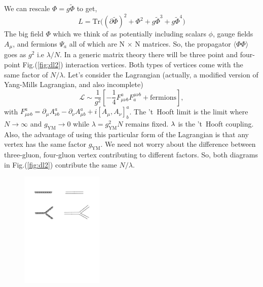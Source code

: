 We can rescale $ \Phi = g \tilde{\Phi}$  to get, 
\begin{equation}
L = \mathrm{Tr} \Bigg( (\partial \tilde{\Phi})^2 + \Phi^2 + g \tilde{\Phi}^3 + g \tilde{\Phi}^4  \Bigg)
\end{equation} 
The big field $\Phi$ which we think of as potentially including scalars $\phi$, gauge fields $A_{\mu}$, and fermions $\Psi_{a}$  all of which are N $\times$ N matrices.
So, the propagator $\langle \Phi \Phi \rangle$ goes as $g^2$ i.e $\lambda/N$. In a generic matrix theory there will be three point and four-point Fig.(\ref{fig:dl2}) interaction
vertices. Both types of vertices come with the same factor of $N/\lambda$. Let's consider the 
Lagrangian (actually, a modified version of Yang-Mills Lagrangian, and also incomplete)
\begin{equation}
\label{eq:action1}
\mathscr{L} \sim  \frac{1}{g^2} \left [ -\frac{1}{4} F_{\mu\nu b}^{a}F^{\mu\nu b}_{a} + \text{fermions} \right]  ,
\end{equation}
with $F_{\mu\nu b}^{a} = \partial_{\mu} A^{a}_{\nu b} - \partial_{\nu} A^{a}_{\mu b} + i [A_{\mu}, A_{\nu}]^{a}_{b}$. 
The 't~Hooft limit is the limit where $N \to \infty$ and $g_{\text{YM}} \to 0$ while $\lambda = g_{\text{YM}}^{2} N $ remains fixed. $\lambda$ is the 
't~Hooft coupling. Also, the advantage of using this particular form of the Lagrangian is that any vertex 
has the same factor $g_{\text{YM}}$. 
We need not worry about the difference between three-gluon, four-gluon vertex contributing 
to different factors. So, both diagrams in Fig.(\ref{fig:dl2}) contribute the same $N/\lambda$. 

\begin{figure}
\begin{center}\includegraphics[width=0.35\textwidth]{./Figures/DL1}\end{center}
\end{figure}

